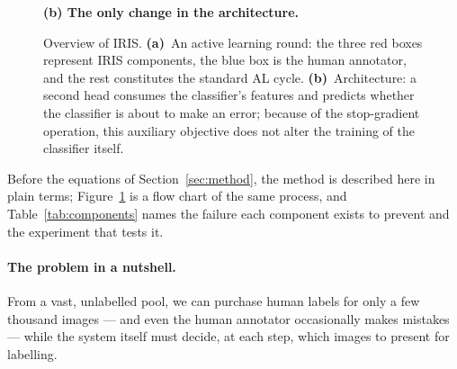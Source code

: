 \documentclass[a4paper,fleqn,longmktitle]{cas-sc}
\newcommand{\method}{IRIS}
\begin{document}
\begin{figure}[pos=htbp]
\vspace{5mm}
{\small\textbf{(b) The only change in the architecture.}}\\[2mm]
\caption{Overview of \method{}. \textbf{(a)}~An active learning round:
the three red boxes represent \method{} components, the blue box is the
human annotator, and the rest constitutes the standard AL cycle.
\textbf{(b)}~Architecture: a second head consumes the classifier's
features and predicts whether the classifier is about to make an error;
because of the stop-gradient operation, this auxiliary objective does
not alter the training of the classifier itself.}
\label{fig:flow}
\end{figure}

Before the equations of Section~\ref{sec:method}, the method is
described here in plain terms; Figure~\ref{fig:flow} is a flow chart of
the same process, and Table~\ref{tab:components} names the failure each
component exists to prevent and the experiment that tests it.

\paragraph{The problem in a nutshell.} From a vast, unlabelled pool, we
can purchase human labels for only a few thousand images --- and even
the human annotator occasionally makes mistakes --- while the system
itself must decide, at each step, which images to present for
labelling.
\end{document}
